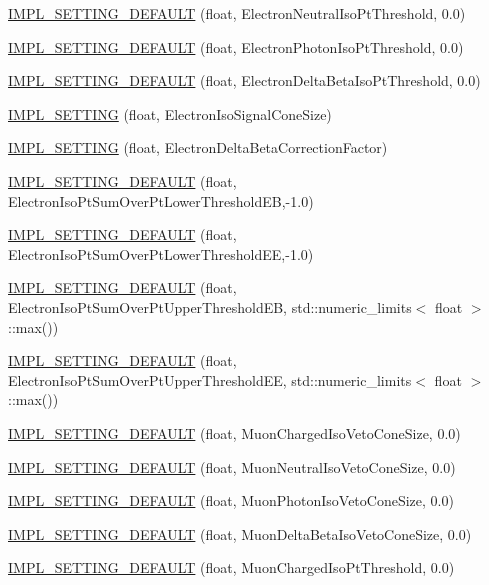 \begin{DoxyCompactItemize}
\item 
\hyperlink{classHttSettings_afe73b2edaa37f30d09551330aa189d3c}{IMPL\_\-SETTING\_\-DEFAULT} (float, ElectronNeutralIsoPtThreshold, 0.0)
\item 
\hyperlink{classHttSettings_aa852f1b761559bf02dbb4bcaa383b6b6}{IMPL\_\-SETTING\_\-DEFAULT} (float, ElectronPhotonIsoPtThreshold, 0.0)
\item 
\hyperlink{classHttSettings_a1515904af8a4c5d04f38bb8a4e115e6a}{IMPL\_\-SETTING\_\-DEFAULT} (float, ElectronDeltaBetaIsoPtThreshold, 0.0)
\item 
\hyperlink{classHttSettings_a18c013ee9d78c831b113e5adb507d3b7}{IMPL\_\-SETTING} (float, ElectronIsoSignalConeSize)
\item 
\hyperlink{classHttSettings_ac294180c9793f6cb652ced772ca22c59}{IMPL\_\-SETTING} (float, ElectronDeltaBetaCorrectionFactor)
\item 
\hyperlink{classHttSettings_a3cd331880ac0f66c6e9883957fef3337}{IMPL\_\-SETTING\_\-DEFAULT} (float, ElectronIsoPtSumOverPtLowerThresholdEB,-\/1.0)
\item 
\hyperlink{classHttSettings_a545431c13430b32a2546f166fb5887e1}{IMPL\_\-SETTING\_\-DEFAULT} (float, ElectronIsoPtSumOverPtLowerThresholdEE,-\/1.0)
\item 
\hyperlink{classHttSettings_a838490218671a3dcaf914069ac0f3fb7}{IMPL\_\-SETTING\_\-DEFAULT} (float, ElectronIsoPtSumOverPtUpperThresholdEB, std::numeric\_\-limits$<$ float $>$::max())
\item 
\hyperlink{classHttSettings_a93e1c8ff1fb422a3f051576e2b476992}{IMPL\_\-SETTING\_\-DEFAULT} (float, ElectronIsoPtSumOverPtUpperThresholdEE, std::numeric\_\-limits$<$ float $>$::max())
\item 
\hyperlink{classHttSettings_a8abae07eb8a153952f975c7517e17a0b}{IMPL\_\-SETTING\_\-DEFAULT} (float, MuonChargedIsoVetoConeSize, 0.0)
\item 
\hyperlink{classHttSettings_afaa4bace4ed28ecc9e357f04edef811b}{IMPL\_\-SETTING\_\-DEFAULT} (float, MuonNeutralIsoVetoConeSize, 0.0)
\item 
\hyperlink{classHttSettings_a57cab6a96a01aa69019efeef1371c0ac}{IMPL\_\-SETTING\_\-DEFAULT} (float, MuonPhotonIsoVetoConeSize, 0.0)
\item 
\hyperlink{classHttSettings_aa9661bf725b0831d31ce28fc385596e2}{IMPL\_\-SETTING\_\-DEFAULT} (float, MuonDeltaBetaIsoVetoConeSize, 0.0)
\item 
\hyperlink{classHttSettings_afa771e6ae4c3f99eef64de1eb5a102ae}{IMPL\_\-SETTING\_\-DEFAULT} (float, MuonChargedIsoPtThreshold, 0.0)

\end{DoxyCompactItemize}
